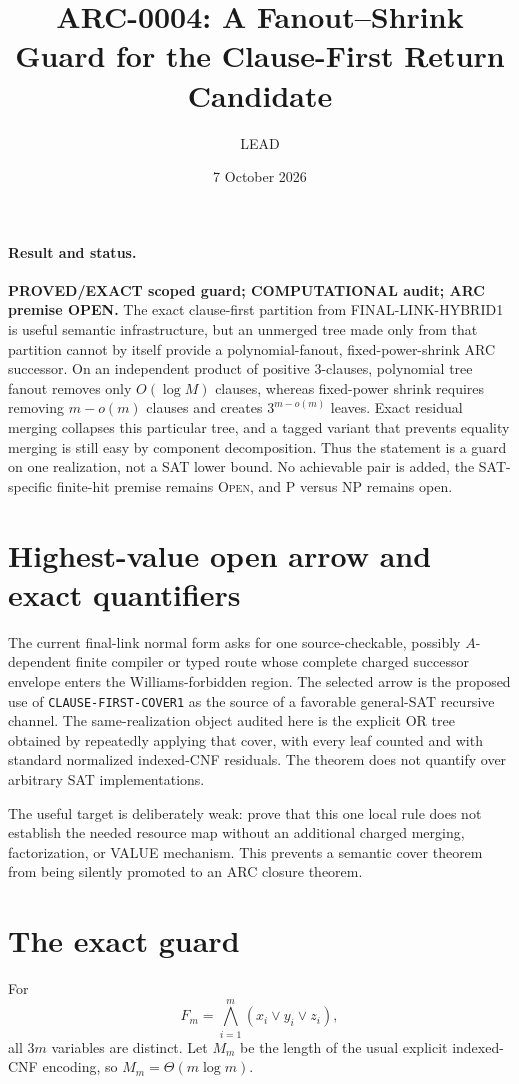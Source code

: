 \documentclass[11pt]{article}
\title{ARC-0004: A Fanout--Shrink Guard for the Clause-First Return Candidate}
\author{LEAD}
\date{7 October 2026}
\begin{document}
\maketitle

\paragraph{Result and status.}
\textbf{PROVED/EXACT scoped guard; COMPUTATIONAL audit; ARC premise OPEN.}
The exact clause-first partition from FINAL-LINK-HYBRID1 is useful semantic
infrastructure, but an unmerged tree made only from that partition cannot by
itself provide a polynomial-fanout, fixed-power-shrink ARC successor.  On an
independent product of positive 3-clauses, polynomial tree fanout removes only
$O(\log M)$ clauses, whereas fixed-power shrink requires removing
$m-o(m)$ clauses and creates $3^{m-o(m)}$ leaves.  Exact residual merging
collapses this particular tree, and a tagged variant that prevents equality
merging is still easy by component decomposition.  Thus the statement is a
guard on one realization, not a SAT lower bound.  No achievable pair is added,
the SAT-specific finite-hit premise remains \textsc{Open}, and P versus NP
remains open.

\section*{Highest-value open arrow and exact quantifiers}
The current final-link normal form asks for one source-checkable, possibly
$A$-dependent finite compiler or typed route whose complete charged successor
envelope enters the Williams-forbidden region.  The selected arrow is the
proposed use of \texttt{CLAUSE-FIRST-COVER1} as the source of a favorable
general-SAT recursive channel.  The same-realization object audited here is
the explicit OR tree obtained by repeatedly applying that cover, with every
leaf counted and with standard normalized indexed-CNF residuals.  The theorem
does not quantify over arbitrary SAT implementations.

The useful target is deliberately weak: prove that this one local rule does
not establish the needed resource map without an additional charged merging,
factorization, or VALUE mechanism.  This prevents a semantic cover theorem
from being silently promoted to an ARC closure theorem.

\section*{The exact guard}
For
\[
 F_m=\bigwedge_{i=1}^{m}(x_i\vee y_i\vee z_i),
\]
all $3m$ variables are distinct.  Let $M_m$ be the length of the usual
explicit indexed-CNF encoding, so $M_m=\Theta(m\log m)$.
\end{document}
